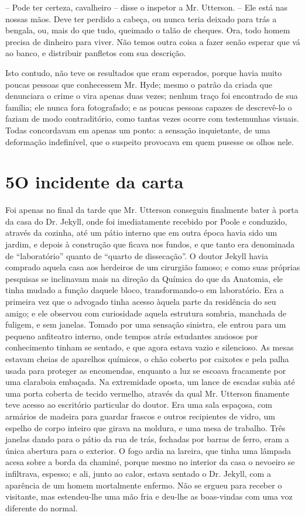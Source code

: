 -- Pode ter certeza, cavalheiro -- disse o inspetor a Mr. Utterson. --
Ele está nas nossas mãos.  Deve ter perdido a cabeça, ou nunca teria
deixado para trás a bengala, ou, mais do que tudo, queimado o talão de
cheques.  Ora, todo homem precisa de dinheiro para viver.  Não temos
outra coisa a fazer senão esperar que vá ao banco, e distribuir
panfletos com sua descrição.

Isto contudo, não teve os resultados que eram esperados, porque havia
muito poucas pessoas que conhecessem Mr. Hyde; mesmo o patrão da criada
que denunciara o crime o vira apenas duas vezes; nenhum traço foi
encontrado de sua família; ele nunca fora fotografado; e as poucas
pessoas capazes de descrevê-lo o faziam de modo contraditório, como
tantas vezes ocorre com testemunhas visuais. Todas concordavam em
apenas um ponto: a sensação inquietante, de uma deformação indefinível,
que o suspeito provocava em quem pusesse os olhos nele. 


\chapter[5 -- O incidente da carta]{5\break O incidente da carta}

Foi apenas no final da tarde que Mr. Utterson conseguiu finalmente bater
à porta da casa do Dr. Jekyll, onde foi imediatamente recebido por
Poole e conduzido, através da cozinha, até um pátio interno que em
outra época havia sido um jardim, e depois à construção que ficava nos
fundos, e que tanto era denominada de “laboratório” quanto de “quarto
de dissecação”.  O doutor Jekyll havia comprado aquela casa aos
herdeiros de um cirurgião famoso; e como suas próprias pesquisas se
inclinavam mais na direção da Química do que da Anatomia, ele tinha
mudado a função daquele bloco, transformando-o em laboratório.  Era a
primeira vez que o advogado tinha acesso àquela parte da residência do
seu amigo; e ele observou com curiosidade  aquela estrutura sombria,
manchada de fuligem, e sem janelas.  Tomado por uma sensação sinistra,
ele entrou para um pequeno anfiteatro interno, onde tempos atrás
estudantes ansiosos por conhecimento tinham se sentado, e que agora
estava vazio e silencioso.  As mesas estavam cheias de aparelhos
químicos, o chão coberto por caixotes e pela palha usada para proteger
as encomendas, enquanto a luz se escoava fracamente por uma claraboia
embaçada. Na extremidade oposta, um lance de escadas subia até uma
porta coberta de tecido vermelho, através da qual Mr. Utterson
finamente teve acesso ao escritório particular do doutor.  Era uma sala
espaçosa, com armários de madeira para guardar frascos e outros
recipientes de vidro, um espelho de corpo inteiro que girava na
moldura, e uma mesa de trabalho.  Três janelas dando para o pátio da
rua de trás, fechadas por barras de ferro, eram a única abertura para o
exterior.  O fogo ardia na lareira, que tinha uma lâmpada acesa sobre a
borda da chaminé, porque mesmo no interior da casa o nevoeiro se
infiltrava, espesso; e ali, junto ao calor, estava sentado o Dr.
Jekyll, com a aparência de um homem mortalmente enfermo.  Não se ergueu
para receber o visitante, mas estendeu-lhe uma mão fria e deu-lhe as
boas-vindas com uma voz diferente do normal.

